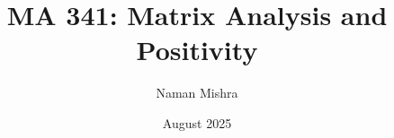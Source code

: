 \documentclass[12pt]{report}
\title{MA 341: Matrix Analysis and Positivity}
\author{Naman Mishra}
\date{August 2025}
\begin{document}
\maketitle
\tableofcontents
\listoflecture
    
    
    
\end{document}

